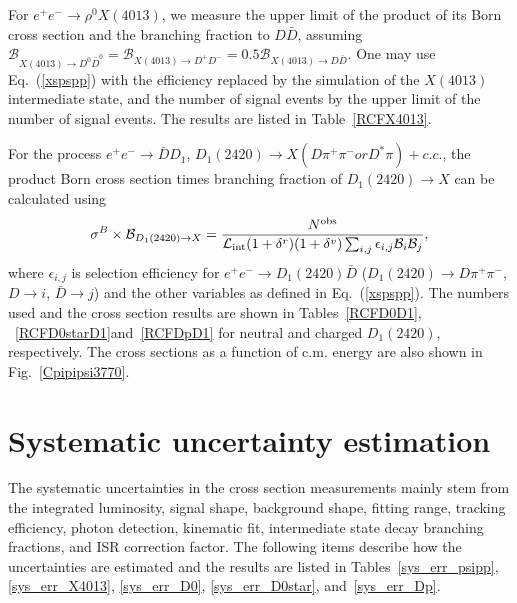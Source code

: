 \documentclass[aps,preprint,superscriptaddress,12pt,tightenlines]{revtex4}
\newcommand{\ddb}{D\bar{D}}
\begin{document}
For $e^{+}e^{-}\to \rho^{0}X(4013)$, we measure the upper limit of
the product of its Born cross section and the branching fraction
to $\ddb$, assuming $\mathcal{B}_{X(4013)\to D^{0}\bar{D}^{0}} =
\mathcal{B}_{X(4013)\to D^{+}D^{-}} = 0.5\mathcal{B}_{X(4013)\to
D\bar{D}}$. One may use Eq.~(\ref{xspspp}) with the efficiency
replaced by the simulation of the $X(4013)$ intermediate state,
and the number of signal events by the upper limit of the number
of signal events. The results are listed in Table~\ref{RCFX4013}.

For the process $e^{+}e^{-}\to \bar{D}D_{1}$, $D_{1}(2420)\to
X(D\pi^{+}\pi^{-} or D^{*}\pi)+c.c.$, the product Born cross section times
branching fraction of $D_{1}(2420)\to X$ can be
calculated using
\begin{equation}
  \sigma^{B}\times \mathcal{B}_{D_{1}(2420)\to X} =
  \frac{N^{\rm obs}}{\mathcal{L}_{\rm int} (1+\delta^{r})
  (1+\delta^{v}) \sum_{i,j}\epsilon_{i,j} \mathcal{B}_{i} \mathcal{B}_{j}},
\end{equation}
where $\epsilon_{i,j}$ is selection efficiency for $e^{+}e^{-} \to
D_{1}(2420)\bar{D}$ ($D_{1}(2420)\to D\pi^{+}\pi^{-}$, $D\to i$,
$\bar{D}\to j$) and the other variables as defined in
Eq.~(\ref{xspspp}). The numbers used and the cross section results
are shown in Tables~\ref{RCFD0D1},  ~\ref{RCFD0starD1}and~\ref{RCFDpD1} for neutral
and charged $D_1(2420)$, respectively. The cross sections as a
function of c.m. energy are also shown in Fig.~\ref{Cpipipsi3770}.

\section{Systematic uncertainty estimation}

The systematic uncertainties in the cross section measurements
mainly stem from the integrated luminosity, signal shape,
background shape, fitting range, tracking efficiency, photon
detection, kinematic fit, intermediate state decay branching
fractions, and ISR correction factor. The following items describe
how the uncertainties are estimated and the results are listed in
Tables~\ref{sys_err_psipp}, \ref{sys_err_X4013}, \ref{sys_err_D0}, \ref{sys_err_D0star},
and~\ref{sys_err_Dp}.
\end{document}
